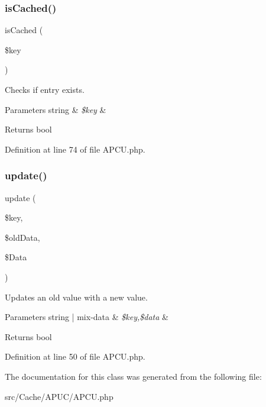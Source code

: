 \mbox{\label{class_zest_1_1_cache_1_1_a_p_c_u_1_1_a_p_c_u_a83d5aac122d402321a64efa1695cccd4}} 
\subsubsection{\texorpdfstring{is\+Cached()}{isCached()}}
{\footnotesize\ttfamily is\+Cached (\begin{DoxyParamCaption}\item[{}]{\$key }\end{DoxyParamCaption})}

Checks if entry exists.


\begin{DoxyParams}[1]{Parameters}
string & {\em \$key} & \\
\hline
\end{DoxyParams}
\begin{DoxyReturn}{Returns}
bool 
\end{DoxyReturn}


Definition at line 74 of file A\+P\+C\+U.\+php.

\mbox{\label{class_zest_1_1_cache_1_1_a_p_c_u_1_1_a_p_c_u_a8c978ff3d82895f2888bd5a3c6b444c9}} 
\subsubsection{\texorpdfstring{update()}{update()}}
{\footnotesize\ttfamily update (\begin{DoxyParamCaption}\item[{}]{\$key,  }\item[{}]{\$old\+Data,  }\item[{}]{\$\+Data }\end{DoxyParamCaption})}

Updates an old value with a new value.


\begin{DoxyParams}[1]{Parameters}
string | mix-\/data & {\em \$key,\$data} & \\
\hline
\end{DoxyParams}
\begin{DoxyReturn}{Returns}
bool 
\end{DoxyReturn}


Definition at line 50 of file A\+P\+C\+U.\+php.



The documentation for this class was generated from the following file\+:\begin{DoxyCompactItemize}
\item 
src/\+Cache/\+A\+P\+U\+C/A\+P\+C\+U.\+php\end{DoxyCompactItemize}
